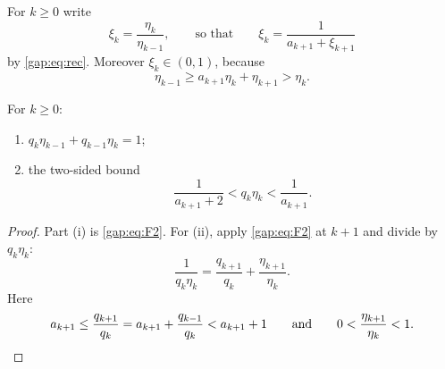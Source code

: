 For $k\ge0$ write
\begin{equation}\label{gap:eq:xi}
\xi_k=\frac{\eta_k}{\eta_{k-1}},
\qquad\text{so that}\qquad
\xi_k=\frac1{a_{k+1}+\xi_{k+1}}
\end{equation}
by \eqref{gap:eq:rec}. Moreover $\xi_k\in(0,1)$, because
\[
\eta_{k-1}\ge a_{k+1}\eta_k+\eta_{k+1}>\eta_k.
\]

\begin{corollary}\label{gap:cor:ineq}
For $k\ge0$:
\begin{enumerate}
\item[(i)] $q_k\eta_{k-1}+q_{k-1}\eta_k=1$;
\item[(ii)] the two-sided bound
\[
\frac1{a_{k+1}+2}<q_k\eta_k<\frac1{a_{k+1}}.
\]
\end{enumerate}
\end{corollary}
\begin{proof}
Part (i) is \eqref{gap:eq:F2}. For (ii), apply \eqref{gap:eq:F2} at $k+1$ and divide by $q_k\eta_k$:
\[
\frac1{q_k\eta_k}=\frac{q_{k+1}}{q_k}+\frac{\eta_{k+1}}{\eta_k}.
\]
Here
\[
a_{k+1}\le\frac{q_{k+1}}{q_k}=a_{k+1}+\frac{q_{k-1}}{q_k}<a_{k+1}+1
\qquad\text{and}\qquad
0<\frac{\eta_{k+1}}{\eta_k}<1.\qedhere
\]
\end{proof}

